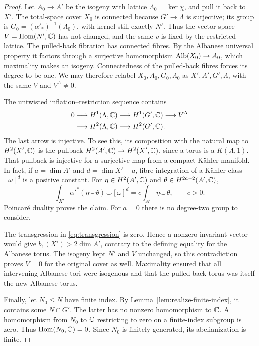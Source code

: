 \begin{proof}
Let \(A_0\to A'\) be the isogeny with lattice
\(\Lambda_0=\ker\chi\), and pull it back to \(X'\). The total-space
cover \(X_0\) is connected because \(G'\to\Lambda\) is surjective;
its group is \(G_0=(\alpha'_*)^{-1}(\Lambda_0)\), with kernel still
exactly \(N'\). Thus the vector space \(V=\operatorname{Hom}(N',\mathbb C)\) has not
changed, and the same \(v\) is fixed by the restricted lattice.
The pulled-back fibration has connected fibres. By the Albanese
universal property it factors through a surjective homomorphism
\(\operatorname{Alb}(X_0)\to A_0\), which maximality makes an isogeny.
Connectedness of the pulled-back fibres forces its degree to be one.
We may therefore relabel \(X_0,A_0,G_0,\Lambda_0\) as
\(X',A',G',\Lambda\), with the same \(V\) and \(V^\Lambda\ne0\).

The untwisted inflation--restriction sequence contains
\begin{equation}\label{eq:transgression}
 \begin{aligned}
 0&\longrightarrow H^1(\Lambda,\mathbb C)
 \longrightarrow H^1(G',\mathbb C)
 \longrightarrow V^\Lambda\\
 &\longrightarrow H^2(\Lambda,\mathbb C)
 \longrightarrow H^2(G',\mathbb C).
 \end{aligned}
\end{equation}
The last arrow is injective. To see this, its composition with
the natural map to \(H^2(X',\mathbb C)\) is the pullback
\(H^2(A',\mathbb C)\to H^2(X',\mathbb C)\), since a torus is a
\(K(\Lambda,1)\). That pullback is injective for a surjective
map from a compact K\"ahler manifold. In fact, if
\(a=\dim A'\) and \(d=\dim X'-a\), fibre integration of a
K\"ahler class \([\omega]^d\) is a positive constant. For
\(\eta\in H^2(A',\mathbb C)\) and \(\theta\in H^{2a-2}(A',\mathbb C)\),
\[
 \int_{X'}\alpha'^*(\eta\smile\theta)\smile[\omega]^d
 =c\int_{A'}\eta\smile\theta,\qquad c>0.
\]
Poincar\'e duality proves the claim. For \(a=0\) there is no
degree-two group to consider.

The transgression in \eqref{eq:transgression} is zero.
Hence a nonzero invariant vector would give
\(b_1(X')>2\dim A'\), contrary to the defining equality for
the Albanese torus. The isogeny kept \(N'\) and \(V\) unchanged, so
this contradiction proves \(V=0\) for the original cover as well.
Maximality ensured that all intervening Albanese tori were isogenous
and that the pulled-back torus was itself the new Albanese torus.

Finally, let \(N_0\le N\) have finite index. By
Lemma~\ref{lem:realize-finite-index}, it contains some
\(N\cap G'\). The latter has no nonzero homomorphism to \(\mathbb C\).
A homomorphism from \(N_0\) to \(\mathbb C\) restricting to zero on
a finite-index subgroup is zero. Thus \(\operatorname{Hom}(N_0,\mathbb C)=0\).
Since \(N_0\) is finitely generated, its abelianization is finite.
\end{proof}


